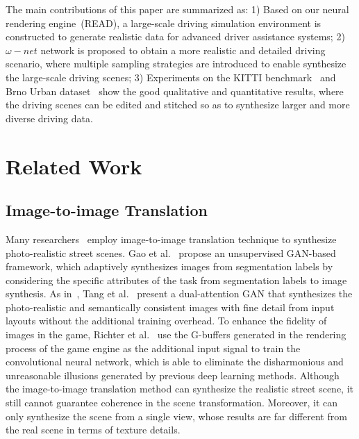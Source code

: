\documentclass[sigconf]{acmart}
\begin{document}
The main contributions of this paper are summarized as: 1) Based on our neural rendering engine~(READ), a large-scale driving simulation environment is constructed to generate realistic data for advanced driver assistance systems; 2) $\omega-net$ network is proposed to obtain a more realistic and detailed driving scenario, where multiple sampling strategies are introduced to enable synthesize the large-scale driving scenes; 3) Experiments on the KITTI benchmark~\cite{geiger2012we} and Brno Urban dataset~\cite{ligocki2020brno} show the good qualitative and quantitative results, where the driving scenes can be edited and stitched so as to synthesize larger and more diverse driving data.





\section{Related Work}
\subsection{Image-to-image Translation}
Many researchers~\cite{gao2020lab2pix,tang2020dual,isola2017image,tang2020local,richter2021enhancing} employ image-to-image translation technique to synthesize photo-realistic street scenes. Gao et al.~\cite{gao2020lab2pix} propose an unsupervised GAN-based framework, which adaptively synthesizes images from segmentation labels by considering the specific attributes of the task from segmentation labels to image synthesis. As in~\cite{gao2020lab2pix}, Tang et al.~\cite{tang2020dual} present a dual-attention GAN that synthesizes the photo-realistic and semantically consistent images with fine detail from input layouts without the additional training overhead. To enhance the fidelity of images in the game, Richter et al.~\cite{richter2021enhancing} use the G-buffers generated in the rendering process of the game engine as the additional input signal to train the convolutional neural network, which is able to eliminate the disharmonious and unreasonable illusions generated by previous deep learning methods. Although the image-to-image translation method can synthesize the realistic street scene, it still cannot guarantee coherence in the scene transformation. Moreover, it can only synthesize the scene from a single view, whose results are far different from the real scene in terms of texture details.
\end{document}

